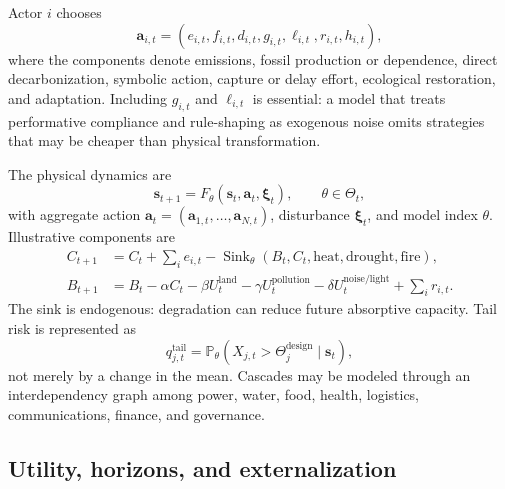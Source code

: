 \documentclass[11pt,a4paper]{article}
\numberwithin{equation}{section}
\theoremstyle{definition}
\theoremstyle{plain}
\theoremstyle{remark}
\newcommand{\Pp}{\mathbb{P}}
\newcommand{\action}{\bm{a}}
\begin{document}
Actor $i$ chooses
\begin{equation}
  \action_{i,t}=(e_{i,t},f_{i,t},d_{i,t},g_{i,t},\ell_{i,t},r_{i,t},h_{i,t}),
  \label{eq:action}
\end{equation}
where the components denote emissions, fossil production or dependence, direct decarbonization, symbolic action, capture or delay effort, ecological restoration, and adaptation. Including $g_{i,t}$ and $\ell_{i,t}$ is essential: a model that treats performative compliance and rule-shaping as exogenous noise omits strategies that may be cheaper than physical transformation.

The physical dynamics are
\begin{equation}
  \bm{s}_{t+1}=F_{\theta}(\bm{s}_t,\action_t,\bm{\xi}_t),
  \qquad \theta\in\Theta_t,
  \label{eq:physicaldynamics}
\end{equation}
with aggregate action $\action_t=(\action_{1,t},\ldots,\action_{N,t})$, disturbance $\bm{\xi}_t$, and model index $\theta$. Illustrative components are
\begin{align}
C_{t+1} &= C_t + \sum_i e_{i,t} - \operatorname{Sink}_{\theta}(B_t,C_t,\text{heat},\text{drought},\text{fire}), \\
B_{t+1} &= B_t - \alpha C_t - \beta U_t^{\mathrm{land}}-\gamma U_t^{\mathrm{pollution}}
           -\delta U_t^{\mathrm{noise/light}} + \sum_i r_{i,t}.
\end{align}
The sink is endogenous: degradation can reduce future absorptive capacity. Tail risk is represented as
\begin{equation}
  q_{j,t}^{\mathrm{tail}}=\Pp_{\theta}\!\left(X_{j,t}>\Theta_j^{\mathrm{design}}\mid \bm{s}_t\right),
  \label{eq:tailrisk}
\end{equation}
not merely by a change in the mean. Cascades may be modeled through an interdependency graph among power, water, food, health, logistics, communications, finance, and governance.

\subsection{Utility, horizons, and externalization}
\end{document}
